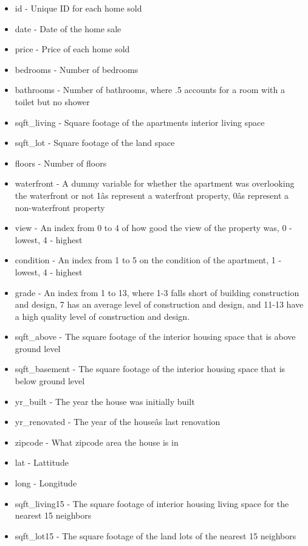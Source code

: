 \documentclass[]{article}
\providecommand{\tightlist}{%
  \setlength{\itemsep}{0pt}\setlength{\parskip}{0pt}}
\begin{document}
\begin{itemize}
\tightlist
\item
  id - Unique ID for each home sold
\item
  date - Date of the home sale
\item
  price - Price of each home sold
\item
  bedrooms - Number of bedrooms
\item
  bathrooms - Number of bathrooms, where .5 accounts for a room with a
  toilet but no shower
\item
  sqft\_living - Square footage of the apartments interior living space
\item
  sqft\_lot - Square footage of the land space
\item
  floors - Number of floors
\item
  waterfront - A dummy variable for whether the apartment was
  overlooking the waterfront or not 1âs represent a waterfront
  property, 0âs represent a non-waterfront property
\item
  view - An index from 0 to 4 of how good the view of the property was,
  0 - lowest, 4 - highest
\item
  condition - An index from 1 to 5 on the condition of the apartment, 1
  - lowest, 4 - highest
\item
  grade - An index from 1 to 13, where 1-3 falls short of building
  construction and design, 7 has an average level of construction and
  design, and 11-13 have a high quality level of construction and
  design.
\item
  sqft\_above - The square footage of the interior housing space that is
  above ground level
\item
  sqft\_basement - The square footage of the interior housing space that
  is below ground level
\item
  yr\_built - The year the house was initially built
\item
  yr\_renovated - The year of the houseâs last renovation
\item
  zipcode - What zipcode area the house is in
\item
  lat - Lattitude
\item
  long - Longitude
\item
  sqft\_living15 - The square footage of interior housing living space
  for the nearest 15 neighbors
\item
  sqft\_lot15 - The square footage of the land lots of the nearest 15
  neighbors
\end{itemize}
\end{document}
